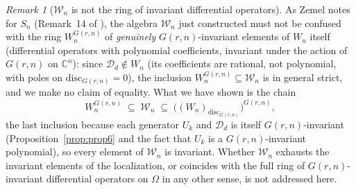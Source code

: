 \documentclass[11pt]{article}
\theoremstyle{remark}
\newtheorem{remark}[theorem]{Remark}
\newcommand{\CC}{\mathbb{C}}
\begin{document}
\begin{remark}[$\mathcal W_n$ is not the ring of invariant differential operators]
As Zemel notes for $S_n$ (Remark~14 of \cite{Ze}), the algebra $\mathcal W_n$ just constructed must not be confused with the ring $W_n^{G(r,n)}$ of \emph{genuinely} $G(r,n)$-invariant elements of $W_n$ itself (differential operators with polynomial coefficients, invariant under the action of $G(r,n)$ on $\CC^n$): since $\mathcal D_d\notin W_n$ (its coefficients are rational, not polynomial, with poles on $\mathrm{disc}_{G(r,n)}=0$), the inclusion $W_n^{G(r,n)}\subseteq\mathcal W_n$ is in general strict, and we make no claim of equality. What we have shown is the chain
\[
W_n^{G(r,n)} \;\subseteq\; \mathcal W_n \;\subseteq\; \big((W_n)_{\mathrm{disc}_{G(r,n)}}\big)^{G(r,n)},
\]
the last inclusion because each generator $U_k$ and $\mathcal D_d$ is itself $G(r,n)$-invariant (Proposition~\ref{prop:prop6} and the fact that $U_k$ is a $G(r,n)$-invariant polynomial), so every element of $\mathcal W_n$ is invariant. Whether $\mathcal W_n$ exhausts the invariant elements of the localization, or coincides with the full ring of $G(r,n)$-invariant differential operators on $\Omega$ in any other sense, is not addressed here.
\end{remark}
\end{document}
